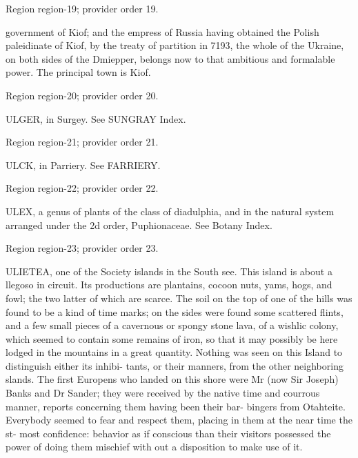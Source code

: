 \documentclass[11pt]{article}
\begin{document}
{\scriptsize\color{gray} Region region-19; provider order 19.\par}
\medskip

government of Kiof; and the empress of Russia having
obtained the Polish paleidinate of Kiof, by the treaty of
partition in 7193, the whole of the Ukraine, on both
sides of the Dmiepper, belongs now to that ambitious and
formalable power. The principal town is Kiof.
\par

{\scriptsize\color{gray} Region region-20; provider order 20.\par}
\medskip

ULGER, in Surgey. See SUNGRAY Index.
\par

{\scriptsize\color{gray} Region region-21; provider order 21.\par}
\medskip

ULCK, in Parriery. See FARRIERY.
\par

{\scriptsize\color{gray} Region region-22; provider order 22.\par}
\medskip

ULEX, a genus of plants of the class of diadulphia,
and in the natural system arranged under the 2d order,
Puphionaceae. See Botany Index.
\par

{\scriptsize\color{gray} Region region-23; provider order 23.\par}
\medskip

ULIETEA, one of the Society islands in the South
see. This island is about a llegoso in circuit. Its
productions are plantains, cocoon nuts, yams, hogs, and
fowl; the two latter of which are scarce. The soil on
the top of one of the hills was found to be a kind of
time marks; on the sides were found some scattered
flints, and a few small pieces of a cavernous or spongy
stone lava, of a wishlic colony, which seemed to contain
some remains of iron, so that it may possibly be here
lodged in the mountains in a great quantity. Nothing
was seen on this Island to distinguish either its inhibi-
tants, or their manners, from the other neighboring
slands. The first Europens who landed on this shore
were Mr (now Sir Joseph) Banks and Dr Sander;
they were received by the native time and courrous
manner, reports concerning them having been their bar-
bingers from Otahteite. Everybody seemed to fear and
respect them, placing in them at the near time the st-
most confidence: behavior as if conscious than their
visitors possessed the power of doing them mischief with
out a disposition to make use of it.
\par
\end{document}

